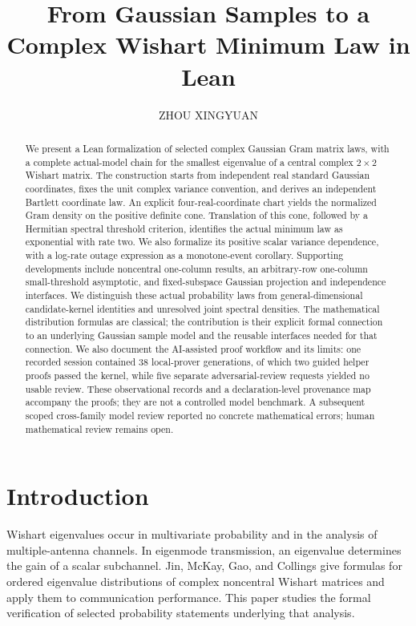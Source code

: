 \documentclass[11pt]{article}
\title{From Gaussian Samples to a Complex Wishart Minimum Law in Lean}
\author{ZHOU XINGYUAN}
\date{}
\begin{document}
\maketitle
\begin{abstract}
We present a Lean formalization of selected complex Gaussian Gram matrix laws,
with a complete actual-model chain for the smallest eigenvalue of a central
complex $2\times2$ Wishart matrix. The construction starts from independent real
standard Gaussian coordinates, fixes the unit complex variance convention, and
derives an independent Bartlett coordinate law. An explicit four-real-coordinate
chart yields the normalized Gram density on the positive definite cone.
Translation of this cone, followed by a Hermitian spectral threshold criterion,
identifies the actual minimum law as exponential with rate two. We also formalize
its positive scalar variance dependence, with a log-rate outage expression as
a monotone-event corollary. Supporting developments include noncentral one-column results,
an arbitrary-row one-column small-threshold asymptotic, and fixed-subspace
Gaussian projection and independence interfaces. We distinguish these actual
probability laws from general-dimensional candidate-kernel identities and
unresolved joint spectral densities. The mathematical distribution formulas
are classical; the contribution is their explicit formal connection to an
underlying Gaussian sample model and the reusable interfaces needed for that
connection. We also document the AI-assisted proof workflow and its limits:
one recorded session contained 38 local-prover generations, of which two guided
helper proofs passed the kernel, while five separate adversarial-review
requests yielded no usable review. These observational records and a
declaration-level provenance map accompany the proofs; they are not a
controlled model benchmark. A subsequent scoped cross-family model review
reported no concrete mathematical errors; human mathematical review remains open.
\end{abstract}

\section{Introduction}
Wishart eigenvalues occur in multivariate probability and in the analysis of
multiple-antenna channels. In eigenmode transmission, an eigenvalue determines
the gain of a scalar subchannel. Jin, McKay, Gao, and Collings
\cite{jin} give formulas for ordered eigenvalue distributions of complex
noncentral Wishart matrices and apply them to communication performance.
This paper studies the formal verification of selected probability statements
underlying that analysis.
\end{document}
